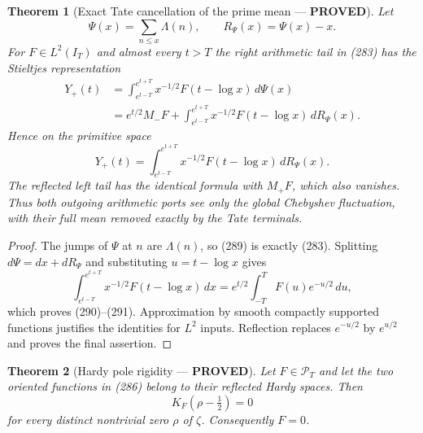 \documentclass[11pt]{article}
\newtheorem{theorem}{Theorem}
\newcommand{\PROVED}{\textcolor{green!45!black}{\textbf{PROVED}}}
\begin{document}
\begin{theorem}[Exact Tate cancellation of the prime mean --- \PROVED]
Let
\begin{equation}
 \Psi(x)=\sum_{n\le x}\Lambda(n),
 \qquad R_\Psi(x)=\Psi(x)-x.                          \tag{288}
\end{equation}
For $F\in L^2(I_T)$ and almost every $t>T$ the right arithmetic tail in
(283) has the Stieltjes representation
\begin{align}
 Y_+(t)
 &=\int_{e^{t-T}}^{e^{t+T}}
 x^{-1/2}F(t-\log x)\,d\Psi(x)                       \tag{289}\\
 &=e^{t/2}M_-F+
 \int_{e^{t-T}}^{e^{t+T}}
 x^{-1/2}F(t-\log x)\,dR_\Psi(x).                    \tag{290}
\end{align}
Hence on the primitive space
\begin{equation}
 \boxed{Y_+(t)=
 \int_{e^{t-T}}^{e^{t+T}}
 x^{-1/2}F(t-\log x)\,dR_\Psi(x).}                  \tag{291}
\end{equation}
The reflected left tail has the identical formula with $M_+F$, which also
vanishes.  Thus both outgoing arithmetic ports see only the global
Chebyshev fluctuation, with their full mean removed exactly by the Tate
terminals.
\end{theorem}

\begin{proof}
The jumps of $\Psi$ at $n$ are $\Lambda(n)$, so (289) is exactly (283).
Splitting $d\Psi=dx+dR_\Psi$ and substituting $u=t-\log x$ gives
\[
 \int_{e^{t-T}}^{e^{t+T}}x^{-1/2}F(t-\log x)\,dx
 =e^{t/2}\int_{-T}^{T}F(u)e^{-u/2}\,du,
\]
which proves (290)--(291).  Approximation by smooth compactly supported
functions justifies the identities for $L^2$ inputs.  Reflection replaces
$e^{-u/2}$ by $e^{u/2}$ and proves the final assertion.
\end{proof}

\begin{theorem}[Hardy pole rigidity --- \PROVED]
Let $F\in\mathcal P_T$ and let the two oriented functions in (286) belong
to their reflected Hardy spaces.  Then
\begin{equation}
 K_F(\rho-\tfrac12)=0                                \tag{292}
\end{equation}
for every distinct nontrivial zero $\rho$ of $\zeta$.  Consequently
$F=0$.
\end{theorem}
\end{document}
